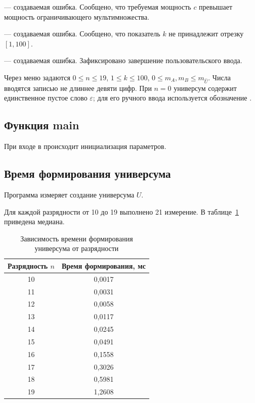 { — создаваемая ошибка.}
{Сообщено, что требуемая мощность $c$ превышает мощность ограничивающего мультимножества.}

{ — создаваемая ошибка.}
{Сообщено, что показатель $k$ не принадлежит отрезку $[1,100]$.}

{ — создаваемая ошибка.}
{Зафиксировано завершение пользовательского ввода.}

Через меню задаются $0\le n\le19$, $1\le k\le100$, $0\le m_A,m_B\le m_{\hat U}$. Числа вводятся записью не длиннее девяти цифр. При $n=0$ универсум содержит единственное пустое слово $\varepsilon$; для его ручного ввода используется обозначение .

\subsection{Функция main}

При входе в  происходит инициализация параметров.

\subsection{Время формирования универсума}

Программа  измеряет создание универсума $U$.


Для каждой разрядности от 10 до 19 выполнено 21 измерение. В таблице~\ref{tab:bench} приведена медиана.

\begin{table}[H]
\caption{Зависимость времени формирования универсума от разрядности}
\label{tab:bench}
\centering
\begin{singlespace}
\begin{tabular}{|c|c|}
\hline
Разрядность $n$ & Время формирования, мс \\\hline
10 & 0,0017 \\\hline
11 & 0,0031 \\\hline
12 & 0,0058 \\\hline
13 & 0,0117 \\\hline
14 & 0,0245 \\\hline
15 & 0,0491 \\\hline
16 & 0,1558 \\\hline
17 & 0,3026 \\\hline
18 & 0,5981 \\\hline
19 & 1,2608 \\\hline
\end{tabular}
\end{singlespace}
\end{table}
